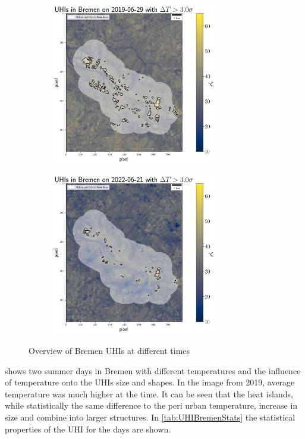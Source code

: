 \documentclass[12pt,a4paper, english,twoside]{scrartcl}
\begin{document}
   \begin{figure}[!p]
       \begin{subfigure}{\textwidth}
          \centering
          \includegraphics[width=0.8\textwidth]{img/UHIs_Bremen_2019-06-29_s:3}
         \label{fig:uhis2019}
       \end{subfigure}

       \begin{subfigure}{\textwidth}
          \centering
          \includegraphics[width=0.8\textwidth]{img/UHIs_Bremen_2022-06-21_s:3}
         \label{fig:uhis2022}
       \end{subfigure}
         \caption{Overview of Bremen \glspl{UHI} at different times}\label{fig:AnalysisBre}
   \end{figure}
       shows two summer days in Bremen with different temperatures and the influence of temperature onto the \glspl{UHI} size and shapes. 
      In the image from 2019, average temperature was much higher at the time. 
      It can be seen that the heat islands, while statistically the same difference to the peri urban temperature, increase in size and combine into larger structures. 
      In \cref{tab:UHIBremenStats} the statistical properties of the \gls{UHI} for the days are shown.
\end{document}
